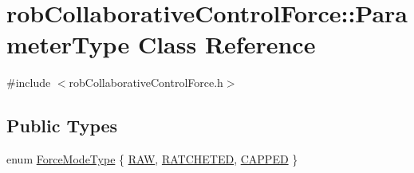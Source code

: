 \hypertarget{classrob_collaborative_control_force_1_1_parameter_type}{}\section{rob\+Collaborative\+Control\+Force\+:\+:Parameter\+Type Class Reference}
\label{classrob_collaborative_control_force_1_1_parameter_type}


{\ttfamily \#include $<$rob\+Collaborative\+Control\+Force.\+h$>$}

\subsection*{Public Types}
\begin{DoxyCompactItemize}
\item 
enum \hyperlink{classrob_collaborative_control_force_1_1_parameter_type_ab4ec71e97ffffd412993ea4f307e9acf}{Force\+Mode\+Type} \{ \hyperlink{classrob_collaborative_control_force_1_1_parameter_type_ab4ec71e97ffffd412993ea4f307e9acfa4c6bc5746883675f68edea09f5073c19}{R\+A\+W}, 
\hyperlink{classrob_collaborative_control_force_1_1_parameter_type_ab4ec71e97ffffd412993ea4f307e9acfad1bda918937747259d06b2a3c9f5fb00}{R\+A\+T\+C\+H\+E\+T\+E\+D}, 
\hyperlink{classrob_collaborative_control_force_1_1_parameter_type_ab4ec71e97ffffd412993ea4f307e9acfa1fddeac5565c7f920f05673521a21e9c}{C\+A\+P\+P\+E\+D}
 \}
\end{DoxyCompactItemize}

